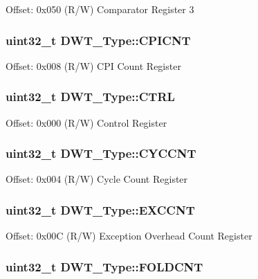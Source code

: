 Offset\-: 0x050 (R/\-W) Comparator Register 3 \hypertarget{structDWT__Type_a88cca2ab8eb1b5b507817656ceed89fc}{
\subsubsection[{C\-P\-I\-C\-N\-T}]{ uint32\-\_\-t D\-W\-T\-\_\-\-Type\-::\-C\-P\-I\-C\-N\-T}}\label{structDWT__Type_a88cca2ab8eb1b5b507817656ceed89fc}
Offset\-: 0x008 (R/\-W) C\-P\-I Count Register \hypertarget{structDWT__Type_a37964d64a58551b69ce4c8097210d37d}{
\subsubsection[{C\-T\-R\-L}]{ uint32\-\_\-t D\-W\-T\-\_\-\-Type\-::\-C\-T\-R\-L}}\label{structDWT__Type_a37964d64a58551b69ce4c8097210d37d}
Offset\-: 0x000 (R/\-W) Control Register \hypertarget{structDWT__Type_a71680298e85e96e57002f87e7ab78fd4}{
\subsubsection[{C\-Y\-C\-C\-N\-T}]{ uint32\-\_\-t D\-W\-T\-\_\-\-Type\-::\-C\-Y\-C\-C\-N\-T}}\label{structDWT__Type_a71680298e85e96e57002f87e7ab78fd4}
Offset\-: 0x004 (R/\-W) Cycle Count Register \hypertarget{structDWT__Type_ac0801a2328f3431e4706fed91c828f82}{
\subsubsection[{E\-X\-C\-C\-N\-T}]{ uint32\-\_\-t D\-W\-T\-\_\-\-Type\-::\-E\-X\-C\-C\-N\-T}}\label{structDWT__Type_ac0801a2328f3431e4706fed91c828f82}
Offset\-: 0x00\-C (R/\-W) Exception Overhead Count Register \hypertarget{structDWT__Type_a35f2315f870a574e3e6958face6584ab}{
\subsubsection[{F\-O\-L\-D\-C\-N\-T}]{ uint32\-\_\-t D\-W\-T\-\_\-\-Type\-::\-F\-O\-L\-D\-C\-N\-T}}\label{structDWT__Type_a35f2315f870a574e3e6958face6584ab}
